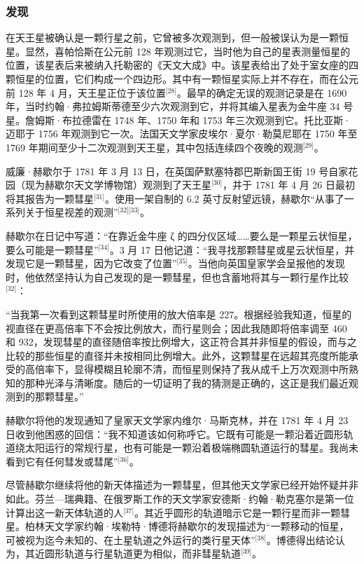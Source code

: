 \subsubsection{发现}
在天王星被确认是一颗行星之前，它曾被多次观测到，但一般被误认为是一颗恒星。显然，喜帕恰斯在公元前 128 年观测过它，当时他为自己的星表测量恒星的位置，该星表后来被纳入托勒密的《天文大成》中。该星表给出了处于室女座的四颗恒星的位置，它们构成一个四边形。其中有一颗恒星实际上并不存在，而在公元前 128 年 4 月，天王星正位于该位置\(^\text{[28]}\)。最早的确定无误的观测记录是在 1690 年，当时约翰·弗拉姆斯蒂德至少六次观测到它，并将其编入星表为金牛座 34 号星。詹姆斯·布拉德雷在 1748 年、1750 年和 1753 年三次观测到它。托比亚斯·迈耶于 1756 年观测到它一次。法国天文学家皮埃尔·夏尔·勒莫尼耶在 1750 年至 1769 年期间至少十二次观测到天王星，其中包括连续四个夜晚的观测\(^\text{[29]}\)。

威廉·赫歇尔于 1781 年 3 月 13 日，在英国萨默塞特郡巴斯新国王街 19 号自家花园（现为赫歇尔天文学博物馆）观测到了天王星\(^\text{[30]}\)，并于 1781 年 4 月 26 日最初将其报告为一颗彗星\(^\text{[31]}\)。使用一架自制的 6.2 英寸反射望远镜，赫歇尔“从事了一系列关于恒星视差的观测”\(^\text{[32][33]}\)。

赫歇尔在日记中写道：“在靠近金牛座 ζ 的四分仪区域……要么是一颗星云状恒星，要么可能是一颗彗星”\(^\text{[34]}\)。3 月 17 日他记道：“我寻找那颗彗星或星云状恒星，并发现它是一颗彗星，因为它改变了位置”\(^\text{[35]}\)。当他向英国皇家学会呈报他的发现时，他依然坚持认为自己发现的是一颗彗星，但也含蓄地将其与一颗行星作比较\(^\text{[32]}\)：

“当我第一次看到这颗彗星时所使用的放大倍率是 227。根据经验我知道，恒星的视直径在更高倍率下不会按比例放大，而行星则会；因此我随即将倍率调至 460 和 932，发现彗星的直径随倍率按比例增大，这正符合其并非恒星的假设，而与之比较的那些恒星的直径并未按相同比例增大。此外，这颗彗星在远超其亮度所能承受的高倍率下，显得模糊且轮廓不清，而恒星则保持了我从成千上万次观测中所熟知的那种光泽与清晰度。随后的一切证明了我的猜测是正确的，这正是我们最近观测到的那颗彗星。”

赫歇尔将他的发现通知了皇家天文学家内维尔·马斯克林，并在 1781 年 4 月 23 日收到他困惑的回信：“我不知道该如何称呼它。它既有可能是一颗沿着近圆形轨道绕太阳运行的常规行星，也有可能是一颗沿着极端椭圆轨道运行的彗星。我尚未看到它有任何彗发或彗尾”\(^\text{[36]}\)。

尽管赫歇尔继续将他的新天体描述为一颗彗星，但其他天文学家已经开始怀疑并非如此。芬兰—瑞典籍、在俄罗斯工作的天文学家安德斯·约翰·勒克塞尔是第一位计算出这一新天体轨道的人\(^\text{[37]}\)。其近乎圆形的轨道暗示它是一颗行星而非一颗彗星。柏林天文学家约翰·埃勒特·博德将赫歇尔的发现描述为“一颗移动的恒星，可被视为迄今未知的、在土星轨道之外运行的类行星天体”\(^\text{[38]}\)。博德得出结论认为，其近圆形轨道与行星轨道更为相似，而非彗星轨道\(^\text{[39]}\)。

